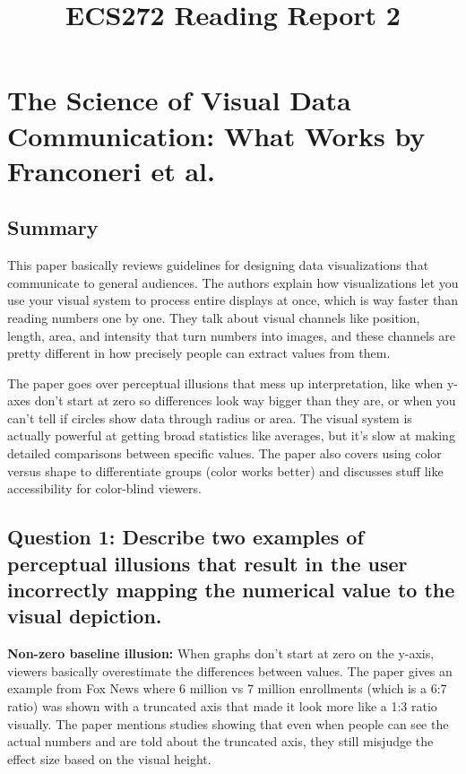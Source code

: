 \documentclass[11pt]{article}
\title{ECS272 Reading Report 2}
\author{}
\date{}
\begin{document}
\maketitle

\section*{The Science of Visual Data Communication: What Works by Franconeri et al.}

\subsection*{Summary}

This paper basically reviews guidelines for designing data visualizations that communicate to general audiences. The authors explain how visualizations let you use your visual system to process entire displays at once, which is way faster than reading numbers one by one. They talk about visual channels like position, length, area, and intensity that turn numbers into images, and these channels are pretty different in how precisely people can extract values from them.

The paper goes over perceptual illusions that mess up interpretation, like when y-axes don't start at zero so differences look way bigger than they are, or when you can't tell if circles show data through radius or area. The visual system is actually powerful at getting broad statistics like averages, but it's slow at making detailed comparisons between specific values. The paper also covers using color versus shape to differentiate groups (color works better) and discusses stuff like accessibility for color-blind viewers.

\subsection*{Question 1: Describe two examples of perceptual illusions that result in the user incorrectly mapping the numerical value to the visual depiction.}

\textbf{Non-zero baseline illusion:} When graphs don't start at zero on the y-axis, viewers basically overestimate the differences between values. The paper gives an example from Fox News where 6 million vs 7 million enrollments (which is a 6:7 ratio) was shown with a truncated axis that made it look more like a 1:3 ratio visually. The paper mentions studies showing that even when people can see the actual numbers and are told about the truncated axis, they still misjudge the effect size based on the visual height.
\end{document}
